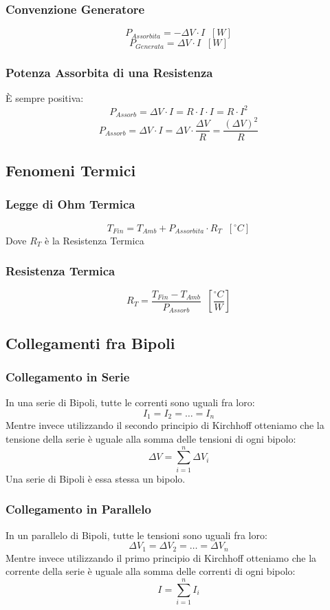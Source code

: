 \documentclass[../main.tex]{subfiles}
\begin{document}
	\subsubsection{Convenzione Generatore}
	\[P_{Assorbita} = -\Delta V \cdot I \;\; [W]\]
	\[P_{Generata} = \Delta V \cdot I \;\; [W]\]
	\subsubsection{Potenza Assorbita di una Resistenza}
	È sempre positiva:
	\[P_{Assorb} = \Delta V \cdot I = R \cdot I \cdot I = R \cdot I^2\]
	\[P_{Assorb} = \Delta V \cdot I = \Delta V \cdot \frac{\Delta V}{R} = \frac{(\Delta V)^2}{R}\]
	\subsection{Fenomeni Termici}
	\subsubsection{Legge di Ohm Termica}
	\[T_{Fin} = T_{Amb} + P_{Assorbita} \cdot R_T \;\; [^\circ C]\]
	Dove $R_T$ è la Resistenza Termica
	\subsubsection{Resistenza Termica}
	\[R_T = \frac{T_{Fin} - T_{Amb}}{P_{Assorb}} \;\; \left[ \frac{^\circ C}{W}\right]\]
	\subsection{Collegamenti fra Bipoli}
	\subsubsection{Collegamento in Serie}
	In una serie di Bipoli, tutte le correnti sono uguali fra loro:
	\[I_1 = I_2 = \dots = I_n\]
	Mentre invece utilizzando il secondo principio di Kirchhoff otteniamo che la tensione della serie è uguale alla somma delle tensioni di ogni bipolo:
	\[\Delta V = \sum_{i = 1}^{n} \Delta V_i\]
	Una serie di Bipoli è essa stessa un bipolo.
	\subsubsection{Collegamento in Parallelo}
	In un parallelo di Bipoli, tutte le tensioni sono uguali fra loro:
	\[\Delta V_1 = \Delta V_2 = \dots = \Delta V_n\]
	Mentre invece utilizzando il primo principio di Kirchhoff otteniamo che la corrente della serie è uguale alla somma delle correnti di ogni bipolo:
	\[I = \sum_{i = 1}^{n} I_i\]
\end{document}

